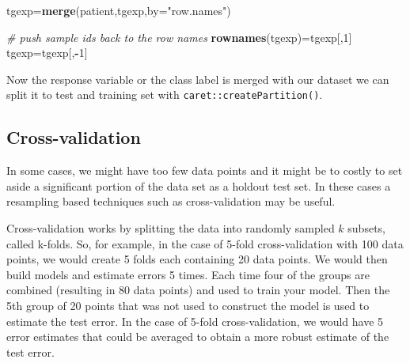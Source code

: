 \documentclass[12pt,]{krantz}
\newenvironment{Shaded}{\begin{snugshade}}{\end{snugshade}}
\newcommand{\CommentTok}[1]{\textcolor[rgb]{0.56,0.35,0.01}{\textit{#1}}}
\newcommand{\DataTypeTok}[1]{\textcolor[rgb]{0.13,0.29,0.53}{#1}}
\newcommand{\DecValTok}[1]{\textcolor[rgb]{0.00,0.00,0.81}{#1}}
\newcommand{\FloatTok}[1]{\textcolor[rgb]{0.00,0.00,0.81}{#1}}
\newcommand{\KeywordTok}[1]{\textcolor[rgb]{0.13,0.29,0.53}{\textbf{#1}}}
\newcommand{\NormalTok}[1]{#1}
\newcommand{\OperatorTok}[1]{\textcolor[rgb]{0.81,0.36,0.00}{\textbf{#1}}}
\newcommand{\StringTok}[1]{\textcolor[rgb]{0.31,0.60,0.02}{#1}}
\begin{document}
\begin{Shaded}
\begin{Highlighting}[]
\NormalTok{tgexp=}\KeywordTok{merge}\NormalTok{(patient,tgexp,}\DataTypeTok{by=}\StringTok{"row.names"}\NormalTok{)}

\CommentTok{# push sample ids back to the row names}
\KeywordTok{rownames}\NormalTok{(tgexp)=tgexp[,}\DecValTok{1}\NormalTok{]}
\NormalTok{tgexp=tgexp[,}\OperatorTok{-}\DecValTok{1}\NormalTok{]}
\end{Highlighting}
\end{Shaded}

Now the response variable or the class label is merged with our dataset we can split it to test and training set with \texttt{caret::createPartition()}.

\begin{Shaded}
\end{Shaded}

\hypertarget{cross-validation}{%
\subsection{Cross-validation}\label{cross-validation}}

In some cases, we might have too few data points and it might be to costly to set aside a significant portion of the data set as a holdout test set. In these cases a resampling based techniques such as cross-validation may be useful.

Cross-validation works by splitting the data into randomly sampled \(k\) subsets, called k-folds. So, for example, in the case of 5-fold cross-validation with 100 data points, we would create 5 folds each containing 20 data points. We would then build models and estimate errors 5 times. Each time four of the groups are combined (resulting in 80 data points) and used to train your model. Then the 5th group of 20 points that was not used to construct the model is used to estimate the test error. In the case of 5-fold cross-validation, we would have 5 error estimates that could be averaged to obtain a more robust estimate of the test error.
\end{document}
